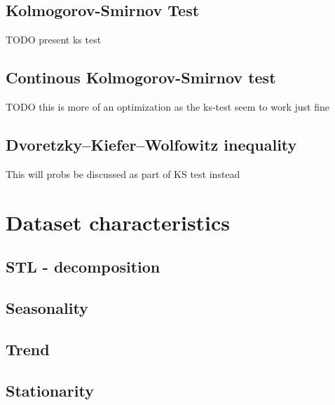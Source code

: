\subsection{Kolmogorov-Smirnov Test}
\label{subsubsec:ks-test}
TODO present ks test
\subsection{Continous Kolmogorov-Smirnov test}
\label{subsubsec:cont-ks-test}
TODO this is more of an optimization as the ks-test seem to work just fine
\subsection{Dvoretzky–Kiefer–Wolfowitz inequality}
\label{subsubsec:dvoretzky-kiefer-wolfowitz}
This will probs be discussed as part of KS test instead

\section{Dataset characteristics}
\label{sec:dataset_characteristics}
\subsection{STL - decomposition}
\subsection{Seasonality}
\subsection{Trend}
\subsection{Stationarity}


